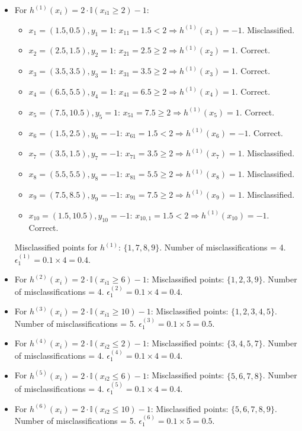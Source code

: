 \begin{itemize}
    \item For $h^{(1)}(x_i) = 2 \cdot \mathbb{I}(x_{i1} \geq 2) - 1$:
    \begin{itemize}
        \item $x_1=(1.5, 0.5), y_1=1$: $x_{11}=1.5 < 2 \Rightarrow h^{(1)}(x_1)=-1$. Misclassified.
        \item $x_2=(2.5, 1.5), y_2=1$: $x_{21}=2.5 \geq 2 \Rightarrow h^{(1)}(x_2)=1$. Correct.
        \item $x_3=(3.5, 3.5), y_3=1$: $x_{31}=3.5 \geq 2 \Rightarrow h^{(1)}(x_3)=1$. Correct.
        \item $x_4=(6.5, 5.5), y_4=1$: $x_{41}=6.5 \geq 2 \Rightarrow h^{(1)}(x_4)=1$. Correct.
        \item $x_5=(7.5, 10.5), y_5=1$: $x_{51}=7.5 \geq 2 \Rightarrow h^{(1)}(x_5)=1$. Correct.
        \item $x_6=(1.5, 2.5), y_6=-1$: $x_{61}=1.5 < 2 \Rightarrow h^{(1)}(x_6)=-1$. Correct.
        \item $x_7=(3.5, 1.5), y_7=-1$: $x_{71}=3.5 \geq 2 \Rightarrow h^{(1)}(x_7)=1$. Misclassified.
        \item $x_8=(5.5, 5.5), y_8=-1$: $x_{81}=5.5 \geq 2 \Rightarrow h^{(1)}(x_8)=1$. Misclassified.
        \item $x_9=(7.5, 8.5), y_9=-1$: $x_{91}=7.5 \geq 2 \Rightarrow h^{(1)}(x_9)=1$. Misclassified.
        \item $x_{10}=(1.5, 10.5), y_{10}=-1$: $x_{10,1}=1.5 < 2 \Rightarrow h^{(1)}(x_{10})=-1$. Correct.
    \end{itemize}
    Misclassified points for $h^{(1)}$: $\{1, 7, 8, 9\}$. Number of misclassifications = 4. $\epsilon_1^{(1)} = 0.1 \times 4 = 0.4$.

    \item For $h^{(2)}(x_i) = 2 \cdot \mathbb{I}(x_{i1} \geq 6) - 1$:
    Misclassified points: $\{1, 2, 3, 9\}$. Number of misclassifications = 4. $\epsilon_1^{(2)} = 0.1 \times 4 = 0.4$.

    \item For $h^{(3)}(x_i) = 2 \cdot \mathbb{I}(x_{i1} \geq 10) - 1$:
    Misclassified points: $\{1, 2, 3, 4, 5\}$. Number of misclassifications = 5. $\epsilon_1^{(3)} = 0.1 \times 5 = 0.5$.

    \item For $h^{(4)}(x_i) = 2 \cdot \mathbb{I}(x_{i2} \leq 2) - 1$:
    Misclassified points: $\{3, 4, 5, 7\}$. Number of misclassifications = 4. $\epsilon_1^{(4)} = 0.1 \times 4 = 0.4$.

    \item For $h^{(5)}(x_i) = 2 \cdot \mathbb{I}(x_{i2} \leq 6) - 1$:
    Misclassified points: $\{5, 6, 7, 8\}$. Number of misclassifications = 4. $\epsilon_1^{(5)} = 0.1 \times 4 = 0.4$.

    \item For $h^{(6)}(x_i) = 2 \cdot \mathbb{I}(x_{i2} \leq 10) - 1$:
    Misclassified points: $\{5, 6, 7, 8, 9\}$. Number of misclassifications = 5. $\epsilon_1^{(6)} = 0.1 \times 5 = 0.5$.
\end{itemize}
